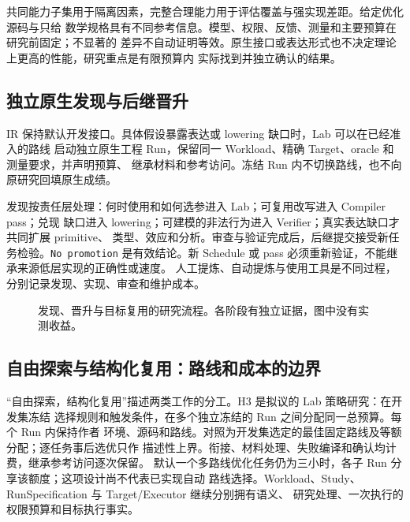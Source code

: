 \documentclass[UTF8,11pt,a4paper,fontset=none]{ctexart}
\newcommand{\code}[1]{\texttt{#1}}
\begin{document}
\FloatBarrier
共同能力子集用于隔离因素，完整合理能力用于评估覆盖与强实现差距。给定优化源码与只给
数学规格具有不同参考信息。模型、权限、反馈、测量和主要预算在研究前固定；不显著的
差异不自动证明等效。原生接口或表达形式也不决定理论上更高的性能，研究重点是有限预算内
实际找到并独立确认的结果。

\subsection{独立原生发现与后继晋升}
IR 保持默认开发接口。具体假设暴露表达或 lowering 缺口时，Lab 可以在已经准入的路线
启动独立原生工程 Run，保留同一 Workload、精确 Target、oracle 和测量要求，并声明预算、
继承材料和参考访问。冻结 Run 内不切换路线，也不向原研究回填原生成绩。

发现按责任层处理：何时使用和如何选参进入 Lab；可复用改写进入 Compiler pass；兑现
缺口进入 lowering；可建模的非法行为进入 Verifier；真实表达缺口才共同扩展 primitive、
类型、效应和分析。审查与验证完成后，后继提交接受新任务检验。\code{No promotion}
是有效结论。新 Schedule 或 pass 必须重新验证，不能继承来源低层实现的正确性或速度。
人工提炼、自动提炼与使用工具是不同过程，分别记录发现、实现、审查和维护成本。

\begin{figure}[htbp]
\centering
{}
\caption{发现、晋升与目标复用的研究流程。各阶段有独立证据，图中没有实测收益。}
\end{figure}

\subsection{自由探索与结构化复用：路线和成本的边界}
“自由探索，结构化复用”描述两类工作的分工。H3 是拟议的 Lab 策略研究：在开发集冻结
选择规则和触发条件，在多个独立冻结的 Run 之间分配同一总预算。每个 Run 内保持作者
环境、源码和路线。对照为开发集选定的最佳固定路线及等额分配；逐任务事后选优只作
描述性上界。衔接、材料处理、失败编译和确认均计费，继承参考访问逐次保留。
默认一个多路线优化任务仍为三小时，各子 Run 分享该额度；这项设计尚不代表已实现自动
路线选择。Workload、Study、RunSpecification 与 Target/Executor 继续分别拥有语义、
研究处理、一次执行的权限预算和目标执行事实。
\end{document}
